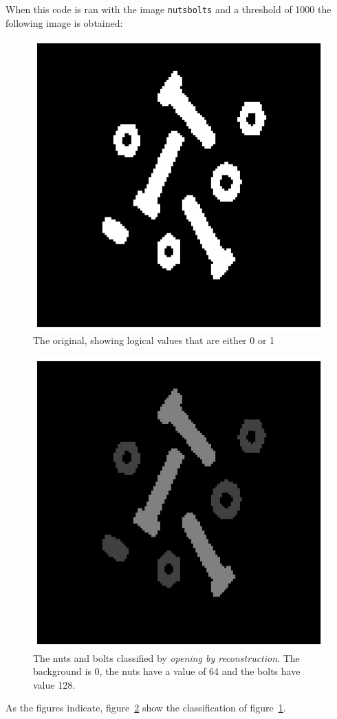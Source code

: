 \clearpage
When this code is ran with the image \texttt{nutsbolts} and a threshold of 1000 the following image is obtained:
\begin{figure}[htb]
 \centering
 \includegraphics[scale=.69]{nutsbolts.eps}
 \caption{The original, showing logical values that are either 0 or 1}
 \label{fig:nutsbolts}
\end{figure}
\begin{figure}[htb]
 \centering
 \includegraphics[scale=.69]{classification.eps}
 \caption{The nuts and bolts classified by \textit{opening by reconstruction}. The background is 0, the nuts have a value of 64 and the bolts have value 128.}
 \label{fig:classification}
\end{figure}

As the figures indicate, figure~\ref{fig:classification} show the classification of figure~\ref{fig:nutsbolts}.
\clearpage